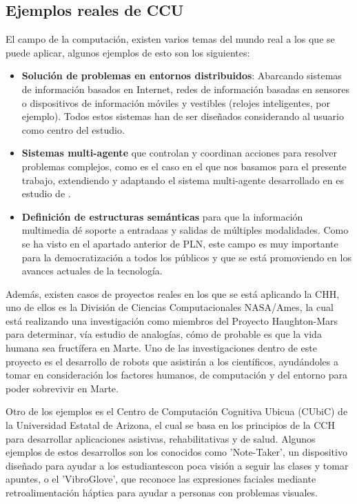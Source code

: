 \subsection{Ejemplos reales de CCU }

El campo de la computación, existen varios temas del mundo real a los que se puede aplicar, algunos ejemplos de esto son los siguientes:

\begin{itemize}
	\item \textbf{Solución de problemas en entornos distribuidos}: Abarcando sistemas de información basados en Internet, redes de información basadas en sensores o dispositivos de información móviles y vestibles (relojes inteligentes, por ejemplo). Todos estos sistemas han de ser diseñados considerando al usuario como centro del estudio.
	
	\item \textbf{Sistemas multi-agente} que controlan y coordinan acciones para resolver problemas complejos, como es el caso en el que nos basamos para el presente trabajo, extendiendo y adaptando el sistema multi-agente desarrollado en es estudio de \cite{park2023generative}.
	
	\item \textbf{Definición de estructuras semánticas} para que la información multimedia dé soporte a entradaas y salidas de múltiples modalidades. Como se ha visto en el apartado anterior de PLN, este campo es muy importante para la democratización a todos los públicos y que se está promoviendo en los avances actuales de la tecnología.
	
\end{itemize}

Además, existen casos de proyectos reales en los que se está aplicando la CHH, uno de ellos es la División de Ciencias Computacionales NASA/Ames, la cual está realizando una investigación como miembros del Proyecto Haughton-Mars para determinar, vía estudio de analogías, cómo de probable es que la vida humana sea fructífera en Marte. Uno de las investigaciones dentro de este proyecto es el desarrollo de robots que asistirán a los científicos, ayudándoles a tomar en consideración los factores humanos, de computación y del entorno para poder sobrevivir en Marte.

Otro de los ejemplos es el Centro de Computación Cognitiva Ubicua (CUbiC) de la Universidad Estatal de Arizona, el cual se basa en los principios de la CCH para desarrollar aplicaciones asistivas, rehabilitativas y de salud. Algunos ejemplos de estos desarrollos son los conocidos como 'Note-Taker', un dispositivo diseñado para ayudar a los estudiantescon poca visión a seguir las clases y tomar apuntes, o el 'VibroGlove', que reconoce las expresiones faciales mediante retroalimentación háptica para ayudar a personas con problemas visuales.

